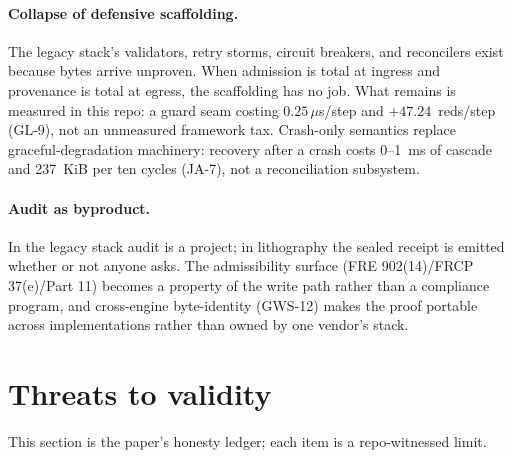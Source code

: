 \documentclass[11pt,a4paper]{article}
\begin{document}
\paragraph{Collapse of defensive scaffolding.} The legacy stack's validators, retry storms,
circuit breakers, and reconcilers exist because bytes arrive unproven. When admission is
total at ingress and provenance is total at egress, the scaffolding has no job. What remains
is measured in this repo: a guard seam costing $0.25\,\mu$s/step and $+47.24$~reds/step
(GL-9), not an unmeasured framework tax. Crash-only semantics replace graceful-degradation
machinery: recovery after a crash costs 0--1~ms of cascade and 237~KiB per ten cycles (JA-7),
not a reconciliation subsystem.

\paragraph{Audit as byproduct.} In the legacy stack audit is a project; in lithography the
sealed receipt is emitted whether or not anyone asks. The admissibility surface
(FRE 902(14)/FRCP 37(e)/Part 11) becomes a property of the write path rather than a
compliance program, and cross-engine byte-identity (GWS-12) makes the proof portable across
implementations rather than owned by one vendor's stack.

\section{Threats to validity}

This section is the paper's honesty ledger; each item is a repo-witnessed limit.
\end{document}
